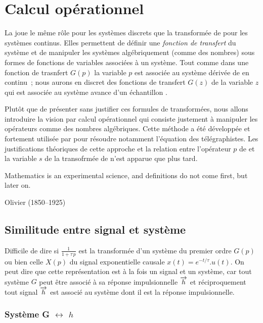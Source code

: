 \section{Calcul opérationnel}
  \def\y{\vec{y}}
  \def\x{\vec{x}}
  \def\xu{\vec{x_1}}
  \def\xd{\vec{x_2}}

La \teZ{} joue le même rôle pour les systèmes discrets que la
transformée de \Laplace{} pour les systèmes continus. Elles permettent
de définir une \emph{fonction de transfert} du système et de manipuler
les systèmes algébriquement (comme des nombres) sous formes de
fonctions de variables associées à un système. Tout comme dans une
fonction de trasnfert $G(p)$ la variable $p$ est associée au système
\og dérivée de \fg{} en continu~; nous aurons en discret des fonctions
de transfert $G(z)$ de la variable $z$ qui est associée au système \og
avance d'un échantillon \fg{}.

Plutôt que de présenter sans justifier ces formules de transformées,
nous allons introduire la vision par calcul opérationnel qui consiste
justement à manipuler les opérateurs comme des nombres
algébriques. Cette méthode a été développée et fortement utilisée par
\Heaviside{} pour résoudre notamment l'équation des
télégraphistes. Les justifications théoriques de cette approche et la
relation entre l'opérateur $p$ de \Heaviside{} et la variable $s$ de
la transofrmée de \Laplace{} n'est apparue que plus tard.

\begin{citations} Mathematics is an experimental science, and
  definitions do not come first, but later on.

  \hfill Olivier \Heaviside{} (1850--1925)
\end{citations}

\subsection{Similitude entre signal et système}

Difficile de dire si $\frac{1}{1+\tau\,p}$ est la transformée d'un
système du premier ordre $G(p)$ ou bien celle $X(p)$ du signal
exponentielle causale $x(t)=e^{-t/\tau}.u(t)$. On peut dire que cette
représentation est à la fois un signal et un système, car tout système
$G$ peut être associé à sa réponse impulsionnelle $\overrightarrow{h}$ et
réciproquement tout signal $\overrightarrow{h}$ est associé au système dont il
est la réponse impulsionnelle.

\subsubsection{Système G $\leftrightarrow$ \RIP{} $h$}

